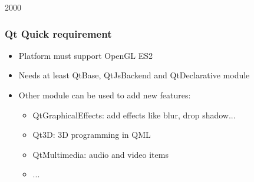 
\begin{slide}{2000}\frametitle{Qt Quick requirement}
\vspace*{1.5em}
\begin{itemize}
\item Platform must support OpenGL ES2
\item Needs at least QtBase, QtJsBackend and QtDeclarative module
\item Other module can be used to add new features:
\begin{itemize}
\item QtGraphicalEffects: add effects like blur, drop shadow...
\item Qt3D: 3D programming in QML
\item QtMultimedia: audio and video items
\item ...
\end{itemize}
\end{itemize}

\end{slide}

